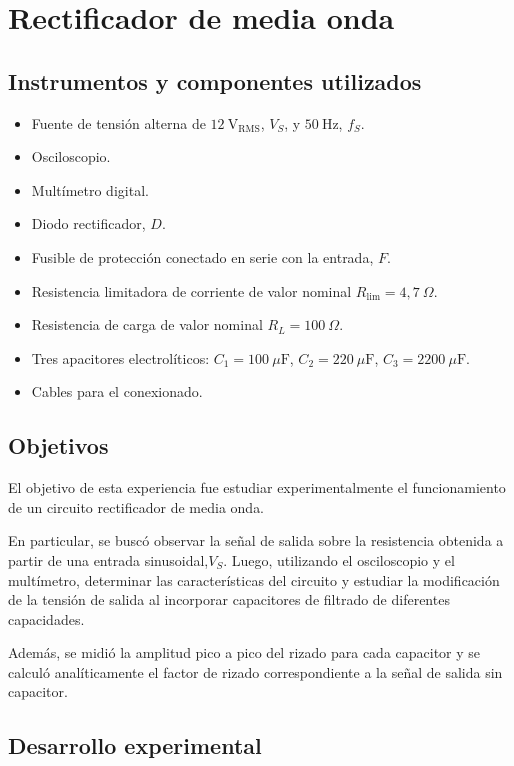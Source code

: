 \section{Rectificador de media onda}

\subsection{Instrumentos y componentes utilizados}

\begin{itemize}
    \item Fuente de tensión alterna de $12\ \mathrm{V_{RMS}}$, $V_S$, y
    $50\ \mathrm{Hz}$, $f_S$.
    \item Osciloscopio.
    \item Multímetro digital.
    \item Diodo rectificador, $D$.
    \item Fusible de protección conectado en serie con la entrada, $F$.
    \item Resistencia limitadora de corriente de valor nominal
    $R_{\lim}=4{,}7\ \Omega$.
    \item Resistencia de carga de valor nominal
    $R_L=100\ \Omega$.
    \item Tres apacitores electrolíticos: $C_1 =100\ \mu\mathrm{F}$, $C_2 =220\ \mu\mathrm{F}$, $C_3 =2200\ \mu\mathrm{F}$.
    \item Cables para el conexionado.
\end{itemize}


\subsection{Objetivos}

El objetivo de esta experiencia fue estudiar experimentalmente el funcionamiento de un circuito rectificador de media onda.

En particular, se buscó observar la señal de salida sobre la resistencia obtenida a partir
de una entrada sinusoidal,$V_S$.  Luego, utilizando el osciloscopio y el multímetro, determinar las características del circuito y estudiar la modificación de la tensión de salida al incorporar capacitores de filtrado de diferentes capacidades.

Además, se midió la amplitud pico a pico del rizado para cada capacitor y se calculó analíticamente el factor de rizado correspondiente a la señal de salida sin capacitor.

\subsection{Desarrollo experimental}

